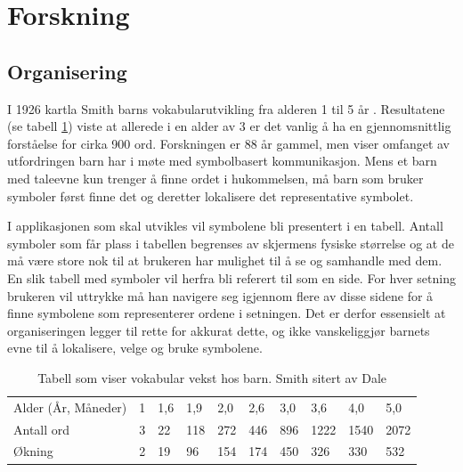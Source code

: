 \documentclass[phd,tocprelim]{cornell}
\begin{document}
\section{Forskning}


\subsection{Organisering}


I 1926 kartla Smith\cite{Smith} barns vokabularutvikling fra alderen 1 til 5 år . Resultatene (se tabell \ref{fig:BarnVak}) viste at allerede i en alder av 3 er det vanlig å ha en gjennomsnittlig forståelse for cirka 900 ord. Forskningen er 88 år gammel, men viser omfanget av utfordringen barn har i møte med symbolbasert kommunikasjon. Mens et barn med taleevne kun trenger å finne ordet i hukommelsen, må barn som bruker symboler først finne det og deretter lokalisere det representative symbolet. 

I applikasjonen som skal utvikles vil symbolene bli presentert i en tabell. Antall symboler som får plass i tabellen begrenses av skjermens fysiske størrelse og at de må være store nok til at brukeren har mulighet til å se  og samhandle med dem. En slik tabell med symboler vil herfra bli referert til som en side. For hver setning brukeren vil uttrykke må han navigere seg igjennom flere av disse sidene for å finne symbolene som representerer ordene i setningen. Det er derfor essensielt at organiseringen legger til rette for akkurat dette, og ikke vanskeliggjør barnets evne til å lokalisere, velge og bruke symbolene.

\begin{table}[h]
\begin{tabular}{llllllllll}
\hline
Alder (År, Måneder) & 1 & 1,6 & 1,9 & 2,0 & 2,6 & 3,0 & 3,6  & 4,0  & 5,0  \\ 
Antall ord          & 3 & 22  & 118 & 272 & 446 & 896 & 1222 & 1540 & 2072 \\ 
Økning              & 2 & 19  & 96  & 154 & 174 & 450 & 326  & 330  & 532  \\ \hline
\end{tabular}
\caption{Tabell som viser vokabular vekst hos barn.  Smith \cite{Smith} sitert av Dale \cite{Dale} }
\label{fig:BarnVak}
\end{table}
\end{document}
